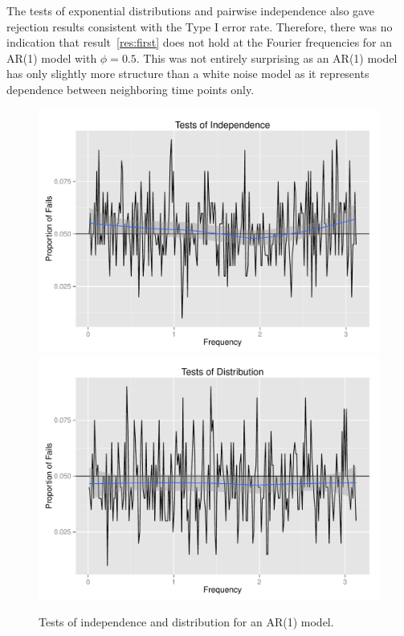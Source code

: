 \documentclass{article}\usepackage[]{graphicx}\usepackage[]{color}
\newenvironment{knitrout}{}{} %
\theoremstyle{plain}
\begin{document}
The tests of exponential distributions and pairwise independence also gave rejection results consistent with the Type I error rate. Therefore, there was no indication that result~\ref{res:first} does not hold at the Fourier frequencies for an AR(1) model with $\phi=0.5$. This was not entirely surprising as an AR(1) model has only slightly more structure than a white noise model as it represents dependence between neighboring time points only.

\begin{knitrout}
\color{fgcolor}\begin{figure}[h]

\includegraphics[width=.49\textwidth]{figure/tests-ar11} 
\includegraphics[width=.49\textwidth]{figure/tests-ar12} \caption[Tests of independence and distribution for an AR(1) model]{Tests of independence and distribution for an AR(1) model.\label{fig:tests-ar1}}
\end{figure}


\end{knitrout}
\end{document}
